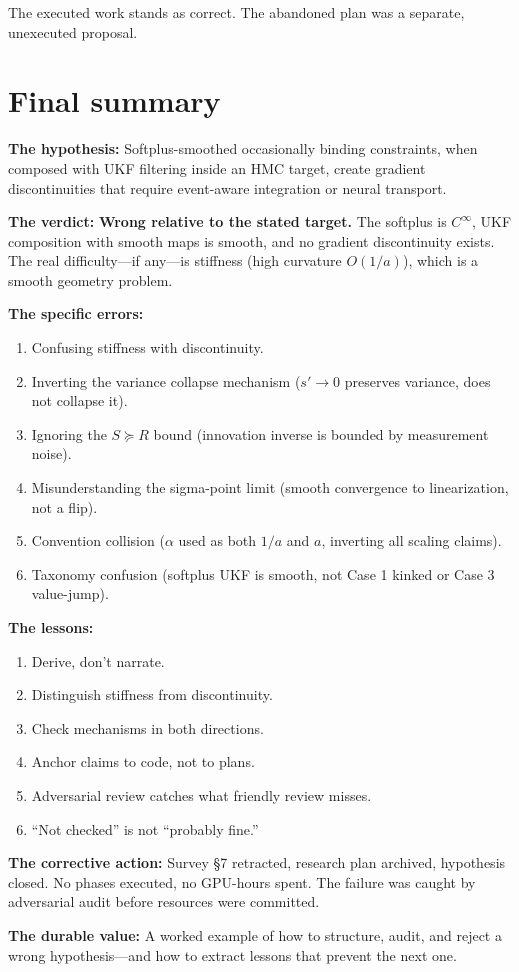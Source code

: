 The executed work stands as correct. The abandoned plan was a separate, unexecuted proposal.

\section{Final summary}

\textbf{The hypothesis:} Softplus-smoothed occasionally binding constraints, when composed with UKF filtering inside an HMC target, create gradient discontinuities that require event-aware integration or neural transport.

\textbf{The verdict:} \textbf{Wrong relative to the stated target.} The softplus is $C^\infty$, UKF composition with smooth maps is smooth, and no gradient discontinuity exists. The real difficulty—if any—is stiffness (high curvature $O(1/a)$), which is a smooth geometry problem.

\textbf{The specific errors:}
\begin{enumerate}
\item Confusing stiffness with discontinuity.
\item Inverting the variance collapse mechanism ($s' \to 0$ preserves variance, does not collapse it).
\item Ignoring the $S \succeq R$ bound (innovation inverse is bounded by measurement noise).
\item Misunderstanding the sigma-point limit (smooth convergence to linearization, not a flip).
\item Convention collision ($\alpha$ used as both $1/a$ and $a$, inverting all scaling claims).
\item Taxonomy confusion (softplus UKF is smooth, not Case 1 kinked or Case 3 value-jump).
\end{enumerate}

\textbf{The lessons:}
\begin{enumerate}
\item Derive, don't narrate.
\item Distinguish stiffness from discontinuity.
\item Check mechanisms in both directions.
\item Anchor claims to code, not to plans.
\item Adversarial review catches what friendly review misses.
\item ``Not checked'' is not ``probably fine.''
\end{enumerate}

\textbf{The corrective action:} Survey §7 retracted, research plan archived, hypothesis closed. No phases executed, no GPU-hours spent. The failure was caught by adversarial audit before resources were committed.

\textbf{The durable value:} A worked example of how to structure, audit, and reject a wrong hypothesis—and how to extract lessons that prevent the next one.
